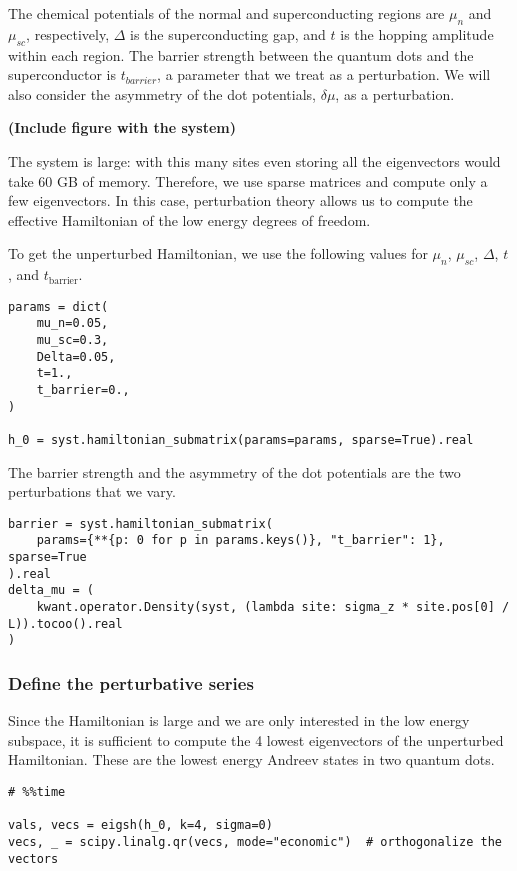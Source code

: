 The chemical potentials of the normal and superconducting regions are $\mu_n$
and $\mu_{sc}$, respectively, $\Delta$ is the superconducting gap, and $t$
is the hopping amplitude within each region.
The barrier strength between the quantum dots and the superconductor is
$t_{barrier}$, a parameter that we treat as a perturbation.
We will also consider the asymmetry of the dot potentials, $\delta \mu$, as a
perturbation.

\textbf{(Include figure with the system)}

The system is large: with this many sites even storing all the eigenvectors
would take 60 GB of memory.
Therefore, we use sparse matrices and compute only a few eigenvectors.
In this case, perturbation theory allows us to compute the effective
Hamiltonian of the low energy degrees of freedom.

To get the unperturbed Hamiltonian, we use the following values for $\mu_n$,
$\mu_{sc}$, $\Delta$, $t$, and $t_{\text{barrier}}$.

\begin{verbatim}
params = dict(
    mu_n=0.05,
    mu_sc=0.3,
    Delta=0.05,
    t=1.,
    t_barrier=0.,
)

h_0 = syst.hamiltonian_submatrix(params=params, sparse=True).real
\end{verbatim}

The barrier strength and the asymmetry of the dot potentials are the two
perturbations that we vary.

\begin{verbatim}
barrier = syst.hamiltonian_submatrix(
    params={**{p: 0 for p in params.keys()}, "t_barrier": 1}, sparse=True
).real
delta_mu = (
    kwant.operator.Density(syst, (lambda site: sigma_z * site.pos[0] / L)).tocoo().real
)
\end{verbatim}

\subsubsection{Define the perturbative series}

Since the Hamiltonian is large and we are only interested in the low energy
subspace, it is sufficient to compute the 4 lowest eigenvectors of the
unperturbed Hamiltonian.
These are the lowest energy Andreev states in two quantum dots.

\begin{verbatim}
# %%time

vals, vecs = eigsh(h_0, k=4, sigma=0)
vecs, _ = scipy.linalg.qr(vecs, mode="economic")  # orthogonalize the vectors
\end{verbatim}

